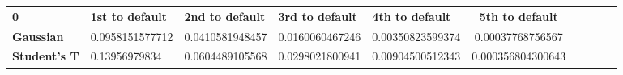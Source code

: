 \begin{center}
 \begin{tabular}{|l|l|l|l|l|c|c|c|c|c|}
\hline
\textbf{0} & \textbf{1st to default} & \textbf{2nd to default} & \textbf{3rd to default} & \textbf{4th to default} & \textbf{5th to default}\\\hhline{|=|=|=|=|=|=|}
\textbf{Gaussian} & 0.0958151577712 & 0.0410581948457 & 0.0160060467246 & 0.00350823599374 & 0.00037768756567\\
\textbf{Student's T} & 0.13956979834 & 0.0604489105568 & 0.0298021800941 & 0.00904500512343 & 0.000356804300643\\
\hline
\end{tabular}
\end{center}